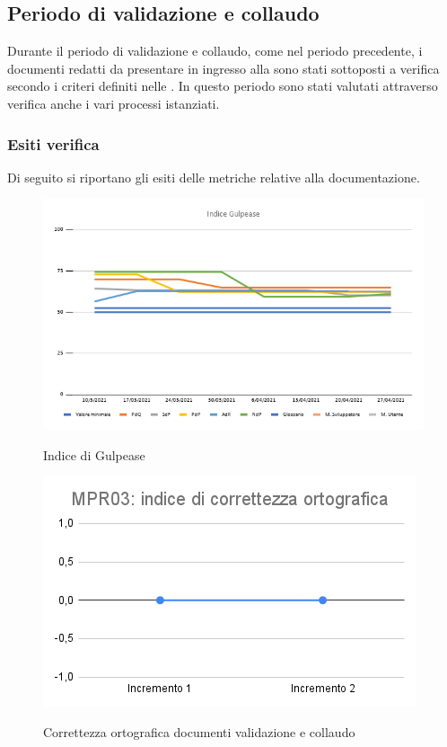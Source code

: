 \subsection{Periodo di validazione e collaudo} \label{ResocontoValidazione}
Durante il periodo di validazione e collaudo, come nel periodo precedente, i documenti redatti da presentare in ingresso alla  sono stati sottoposti a verifica secondo i criteri definiti nelle . In questo periodo sono stati valutati attraverso verifica anche i vari processi istanziati.
\subsubsection{Esiti verifica}
Di seguito si riportano gli esiti delle metriche relative alla documentazione.
\begin{figure}[h]
	\centering
	\includegraphics[scale=0.5]{Immagini/GulpeaseDettaglio}\\
	\caption{Indice di Gulpease}
	\label{fig:GulpeasePDettaglio}
\end{figure}
\begin{figure}[h]
	\centering
	\includegraphics[scale=0.6]{Immagini/MPR03_cortograficaValidazione.png}\\
	\caption{Correttezza ortografica documenti validazione e collaudo}
	\label{fig:CortOrtograficaValidazione}
\end{figure}
